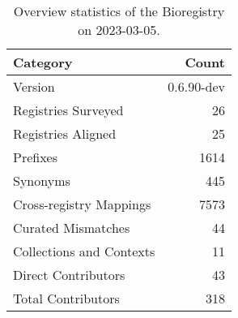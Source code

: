 \begin{table}
\centering
\caption{Overview statistics of the Bioregistry on 2023-03-05.}
\label{tab:bioregistry-summary}
\begin{tabular}{lr}
\toprule
                Category &      Count \\
\midrule
                 Version & 0.6.90-dev \\
     Registries Surveyed &         26 \\
      Registries Aligned &         25 \\
                Prefixes &       1614 \\
                Synonyms &        445 \\
 Cross-registry Mappings &       7573 \\
      Curated Mismatches &         44 \\
Collections and Contexts &         11 \\
     Direct Contributors &         43 \\
      Total Contributors &        318 \\
\bottomrule
\end{tabular}
\end{table}

